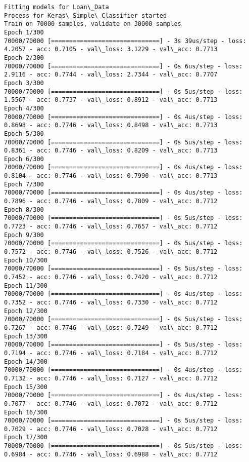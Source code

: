\documentclass[11pt]{article}
\begin{document}
    \begin{Verbatim}[commandchars=\\\{\}]
Fitting models for Loan\_Data
Process for Keras\_Simple\_Classifier started
Train on 70000 samples, validate on 30000 samples
Epoch 1/300
70000/70000 [==============================] - 3s 39us/step - loss: 4.2057 - acc: 0.7105 - val\_loss: 3.1229 - val\_acc: 0.7713
Epoch 2/300
70000/70000 [==============================] - 0s 6us/step - loss: 2.9116 - acc: 0.7744 - val\_loss: 2.7344 - val\_acc: 0.7707
Epoch 3/300
70000/70000 [==============================] - 0s 5us/step - loss: 1.5567 - acc: 0.7737 - val\_loss: 0.8912 - val\_acc: 0.7713
Epoch 4/300
70000/70000 [==============================] - 0s 4us/step - loss: 0.8698 - acc: 0.7746 - val\_loss: 0.8498 - val\_acc: 0.7713
Epoch 5/300
70000/70000 [==============================] - 0s 5us/step - loss: 0.8361 - acc: 0.7746 - val\_loss: 0.8209 - val\_acc: 0.7713
Epoch 6/300
70000/70000 [==============================] - 0s 4us/step - loss: 0.8104 - acc: 0.7746 - val\_loss: 0.7990 - val\_acc: 0.7713
Epoch 7/300
70000/70000 [==============================] - 0s 4us/step - loss: 0.7896 - acc: 0.7746 - val\_loss: 0.7809 - val\_acc: 0.7712
Epoch 8/300
70000/70000 [==============================] - 0s 5us/step - loss: 0.7723 - acc: 0.7746 - val\_loss: 0.7657 - val\_acc: 0.7712
Epoch 9/300
70000/70000 [==============================] - 0s 5us/step - loss: 0.7572 - acc: 0.7746 - val\_loss: 0.7526 - val\_acc: 0.7712
Epoch 10/300
70000/70000 [==============================] - 0s 5us/step - loss: 0.7452 - acc: 0.7746 - val\_loss: 0.7420 - val\_acc: 0.7712
Epoch 11/300
70000/70000 [==============================] - 0s 4us/step - loss: 0.7352 - acc: 0.7746 - val\_loss: 0.7330 - val\_acc: 0.7712
Epoch 12/300
70000/70000 [==============================] - 0s 5us/step - loss: 0.7267 - acc: 0.7746 - val\_loss: 0.7249 - val\_acc: 0.7712
Epoch 13/300
70000/70000 [==============================] - 0s 5us/step - loss: 0.7194 - acc: 0.7746 - val\_loss: 0.7184 - val\_acc: 0.7712
Epoch 14/300
70000/70000 [==============================] - 0s 4us/step - loss: 0.7132 - acc: 0.7746 - val\_loss: 0.7127 - val\_acc: 0.7712
Epoch 15/300
70000/70000 [==============================] - 0s 4us/step - loss: 0.7077 - acc: 0.7746 - val\_loss: 0.7072 - val\_acc: 0.7712
Epoch 16/300
70000/70000 [==============================] - 0s 5us/step - loss: 0.7029 - acc: 0.7746 - val\_loss: 0.7028 - val\_acc: 0.7712
Epoch 17/300
70000/70000 [==============================] - 0s 5us/step - loss: 0.6984 - acc: 0.7746 - val\_loss: 0.6988 - val\_acc: 0.7712

\end{Verbatim}
\end{document}
